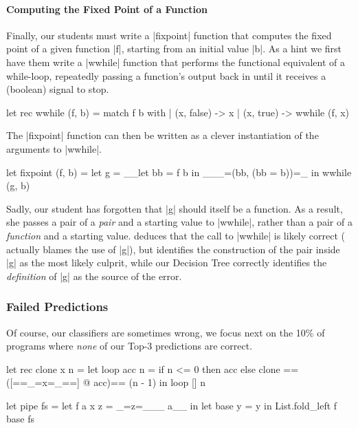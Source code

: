 \paragraph{Computing the Fixed Point of a Function}
Finally, our students must write a |fixpoint| function that computes the
fixed point of a given function |f|, starting from an initial value |b|.
%
As a hint we first have them write a |wwhile| function that performs the
functional equivalent of a while-loop, repeatedly passing a function's
output back in until it receives a (boolean) signal to stop.
%
\begin{ecode}
  let rec wwhile (f, b) =
    match f b with
    | (x, false) -> x
    | (x, true)  -> wwhile (f, x)
\end{ecode}
\lstset{firstnumber=last}
%
The |fixpoint| function can then be written as a clever instantiation of
the arguments to |wwhile|.
%
\begin{ecode}
  let fixpoint (f, b) =
    let g = __let bb = f b in ___=(bb, (bb = b))=_ in
    wwhile (g, b)
\end{ecode}
\lstset{firstnumber=1}
%
Sadly, our student has forgotten that |g| should itself be a function.
%
As a result, she passes a pair of a \emph{pair} and a starting value to
|wwhile|, rather than a pair of a \emph{function} and a starting value.
%
\sherrloc deduces that the call to |wwhile| is likely correct (\ocaml
actually blames the use of |g|), but identifies the construction of the
pair inside |g| as the most likely culprit, while our Decision Tree
correctly identifies the \emph{definition} of |g| as the source of the
error.


\subsubsection{Failed Predictions}
\label{sec:failed-predictions}
Of course, our classifiers are sometimes wrong, we focus next on the
10\% of programs where \emph{none} of our Top-3 predictions are correct.

\begin{ecode}
  let rec clone x n =
    let loop acc n =
      if n <= 0 then
        acc
      else
        clone ==([==_=x=_==] @ acc)== (n - 1) in
    loop [] n
\end{ecode}

\begin{ecode}
  let pipe fs =
    let f a x z = _=z=___ a__ in
    let base y = y in
    List.fold_left f base fs
\end{ecode}

